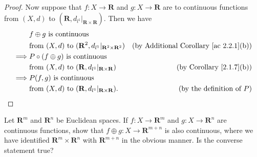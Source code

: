 \begin{proof}
    Now suppose that \(f : X \to \mathbf{R}\) and \(g : X \to \mathbf{R}\) are to continuous functions from \((X, d)\) to \((\mathbf{R}, d_{l^1}|_{\mathbf{R} \times \mathbf{R}})\).
    Then we have
    \begin{align*}
                 & f \oplus g \text{ is continuous }                                                                                                                \\
                 & \text{from } (X, d) \text{ to } (\mathbf{R}^2, d_{l^1}|_{\mathbf{R}^2 \times \mathbf{R}^2}) & \text{(by Additional Corollary \ref{ac 2.2.1}(b))} \\
        \implies & P \circ (f \oplus g) \text{ is continuous }                                                                                                      \\
                 & \text{from } (X, d) \text{ to } (\mathbf{R}, d_{l^1}|_{\mathbf{R} \times \mathbf{R}})       & \text{(by Corollary \ref{2.1.7}(b))}               \\
        \implies & P(f, g) \text{ is continuous }                                                                                                                   \\
                 & \text{from } (X, d) \text{ to } (\mathbf{R}, d_{l^1}|_{\mathbf{R} \times \mathbf{R}}).      & \text{(by the definition of \(P\))}
    \end{align*}
\end{proof}

\begin{exercise}\label{ex 2.2.6}
    Let \(\mathbf{R}^m\) and \(\mathbf{R}^n\) be Euclidean spaces.
    If \(f : X \to \mathbf{R}^m\) and \(g : X \to \mathbf{R}^n\) are continuous functions, show that \(f \oplus g : X \to \mathbf{R}^{m + n}\) is also continuous, where we have identified \(\mathbf{R}^m \times \mathbf{R}^n\) with \(\mathbf{R}^{m + n}\) in the obvious manner.
    Is the converse statement true?
\end{exercise}

